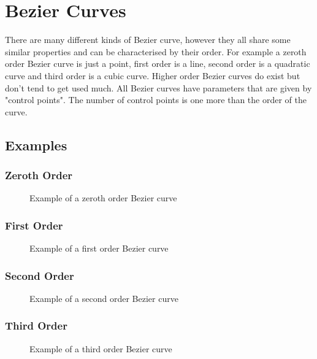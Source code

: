 \documentclass[a5paper,12pt]{book}
\begin{document}

\clearpage
\tableofcontents
\listoftables
\listoffigures
\clearpage

\chapter{Bezier Curves}
There are many different kinds of Bezier curve, however they all share some similar properties and can be characterised by their order.
For example a zeroth order Bezier curve is just a point, first order is a line, second order is a quadratic curve and third order is a cubic curve.
Higher order Bezier curves do exist but don't tend to get used much. All Bezier curves have parameters that are given by "control points". The number of control points is one more than the order of the curve.
\section{Examples}
\subsection{Zeroth Order}
\begin{figure}[h]
    \centering
    
    \caption{Example of a zeroth order Bezier curve} \label{fig:example-zeroth}
\end{figure}
\subsection{First Order}
\begin{figure}[h]
    \centering
    
    \caption{Example of a first order Bezier curve} \label{fig:example-first}
\end{figure}
\subsection{Second Order}
\begin{figure}[h]
    \centering
    
    \caption{Example of a second order Bezier curve} \label{fig:example-second}
\end{figure}
\subsection{Third Order}
\begin{figure}[h]
    \centering
    
    \caption{Example of a third order Bezier curve} \label{fig:example-third}
\end{figure}
\clearpage
{}
\printindex
\end{document}
